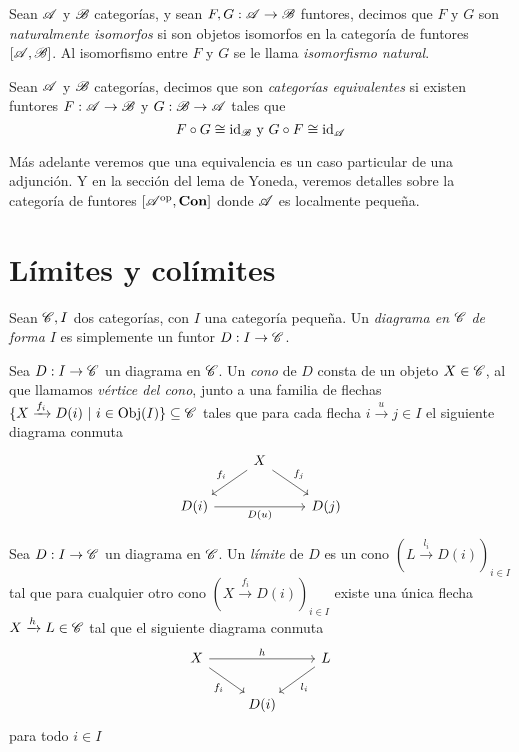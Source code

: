 \documentclass{comunicaciones}
\begin{document}
\begin{dfn}
Sean $\mathscr A$ y $\mathscr B$ categorías, y sean $F,G:\mathscr A\to\mathscr B$ funtores, decimos que $F$ y $G$ son \emph{naturalmente isomorfos} si son objetos isomorfos en la 
categoría de funtores $[\mathscr A,\mathscr B]$. Al isomorfismo entre $F$ y $G$ se le llama \emph{isomorfismo natural}.
\end{dfn}

\begin{dfn}
Sean $\mathscr A$ y $\mathscr B$ categorías, decimos que son \emph{categorías equivalentes} si existen funtores $F:\mathscr A\to \mathscr B$ y $G:\mathscr B\to\mathscr A$ tales que
\begin{equation*}
F\circ G\cong \mathrm{id}_\mathscr B \text{ y }G\circ F\cong \mathrm{id}_\mathscr A
\end{equation*}
\end{dfn}
Más adelante veremos que una equivalencia es un caso particular de una adjunción. Y en la sección del lema de Yoneda, veremos detalles 
sobre la categoría de funtores $[\mathscr A^{\mathrm{op}},\mathbf{Con}]$ donde $\mathscr A$ es localmente pequeña.

\section{Límites y colímites}

\begin{dfn}[Diagrama]
    Sean $\mathscr C,I$ dos categorías, con $I$ una categoría pequeña. Un \emph{diagrama en} $\mathscr C$ \emph{de forma} $I$ es simplemente un funtor $D:I\to\mathscr C$.   
\end{dfn}

\begin{dfn}[Cono]
    Sea $D:I\to\mathscr C$ un diagrama en $\mathscr C$. Un \emph{cono} de $D$ consta de un objeto $X\in\mathscr C$, al que llamamos \emph{vértice del cono}, junto a una familia
    de flechas $\{X\xrightarrow{f_i}D(i) \ |\ i\in\Obj(I)\}\subseteq\C$ tales que para cada flecha $i\xrightarrow{u}j\in I$ el siguiente diagrama conmuta
    \[\begin{tikzcd}
        & X \\
        {D(i)} && {D(j)}
        \arrow["{f_i}"', from=1-2, to=2-1]
        \arrow["{f_j}", from=1-2, to=2-3]
        \arrow["{D(u)}"', from=2-1, to=2-3]
    \end{tikzcd}\]
\end{dfn}

\begin{dfn}[Límite]
    Sea $D:I\to\mathscr C$ un diagrama en $\mathscr C$. Un \emph{límite} de $D$ es un cono $(L\xrightarrow{l_i}D(i))_{i\in I}$ tal que para cualquier otro cono $(X\xrightarrow{f_i}D(i))_{i\in I}$
    existe una única flecha $X\xrightarrow{h}L\in\mathscr C$ tal que el siguiente diagrama conmuta
    \[\begin{tikzcd}
        X && L \\
        & {D(i)}
        \arrow["h", from=1-1, to=1-3]
        \arrow["{f_i}"', from=1-1, to=2-2]
        \arrow["{l_i}", from=1-3, to=2-2]
    \end{tikzcd}\] para todo $i\in I$
\end{dfn}
\end{document}
